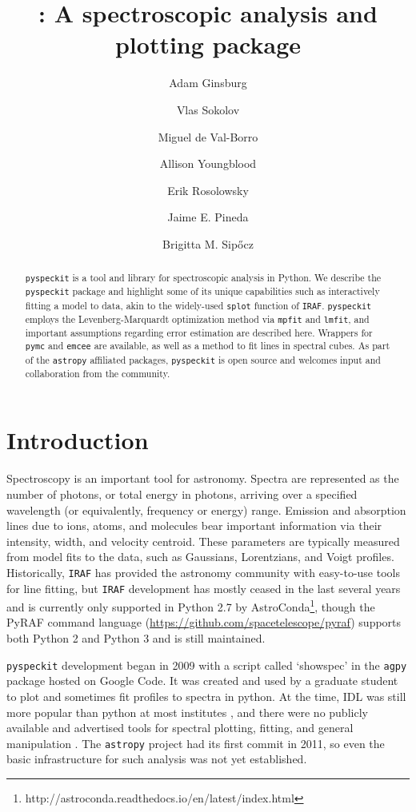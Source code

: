 \documentclass[twocolumn]{aastex62}
\newcommand{\pyspeckit}{\texttt{pyspeckit}\xspace}
\newcommand{\astropy}{\texttt{astropy}\xspace}
\begin{document}
\title{{:} A spectroscopic analysis and plotting package}

\author[0000-0001-6431-9633]{Adam Ginsburg}

\author{Vlas Sokolov}
\author{Miguel de Val-Borro}
\author{Allison Youngblood}
\author{Erik Rosolowsky}
\author[0000-0002-3972-1978]{Jaime E. Pineda}
\author[0000-0002-3713-6337]{Brigitta M. Sip\H{o}cz}


\begin{abstract}
\pyspeckit is a tool and library for spectroscopic analysis in Python. We
describe the \pyspeckit package and highlight some of its unique capabilities
such as interactively fitting a model to data, akin to the widely-used
\texttt{splot} function of \texttt{IRAF}. \pyspeckit employs the
Levenberg-Marquardt optimization method via \texttt{mpfit} and \texttt{lmfit},
and important assumptions regarding error estimation are described here.
Wrappers for \texttt{pymc} and \texttt{emcee} are available, as well as a
method to fit lines in spectral cubes. As part of the \astropy affiliated
packages, \pyspeckit is open source and welcomes input and collaboration from
the community.
\end{abstract}


\section{Introduction}
Spectroscopy is an important tool for astronomy. Spectra are represented as
the number of photons, or total energy in photons, arriving over a specified
wavelength (or equivalently, frequency or energy) range. Emission and
absorption lines due to ions, atoms, and molecules bear important information
via their intensity, width, and velocity centroid. These parameters are
typically measured from model fits to the data, such as Gaussians, Lorentzians,
and Voigt profiles. Historically, \texttt{IRAF} has provided the astronomy
community with easy-to-use tools for line fitting, but \texttt{IRAF}
development has mostly ceased in the last several years and is currently only
supported in Python 2.7 by
AstroConda\footnote{http://astroconda.readthedocs.io/en/latest/index.html},
though the PyRAF command language
(\url{https://github.com/spacetelescope/pyraf}) supports both Python 2 and
Python 3 and is still maintained.


\pyspeckit development began in 2009 with a script called `showspec'
in the \texttt{agpy} package hosted on Google Code. It was created and used by
a graduate student to plot and sometimes fit profiles to spectra in python. At the time,
IDL was still more popular than python at most institutes \citep[first evidence
that python had overtaken IDL in popularity among astronomers was presented in
]{Momcheva2015a}, and there were no publicly available and advertised tools for
spectral plotting, fitting, and general manipulation \cite[\texttt{astropysics}
was developed contemporaneously and solved many of the same problems as
\pyspeckit][]{Tollerud2012a}. The \astropy project had its first commit in
2011, so even the basic infrastructure for such analysis was not yet
established.
\end{document}
